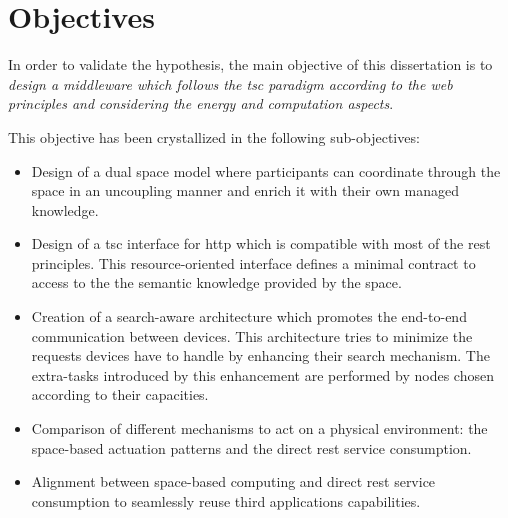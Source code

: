 \section{Objectives}

In order to validate the hypothesis, the main objective of this dissertation is to
\emph{design a middleware which follows the \ac{tsc} paradigm according to the web principles and considering the energy and computation aspects}.

This objective has been crystallized in the following sub-objectives:

\begin{itemize} %
  \item Design of a dual space model where participants can coordinate through the space in an uncoupling manner and enrich it with their own managed knowledge.
  \item Design of a \ac{tsc} interface for \ac{http} which is compatible with most of the \ac{rest} principles.
	This resource-oriented interface defines a minimal contract to access to the the semantic knowledge provided by the space. %
  \item Creation of a search-aware architecture which promotes the end-to-end communication between devices. %
	This architecture tries to minimize the requests devices have to handle by enhancing their search mechanism.
	The extra-tasks introduced by this enhancement are performed by nodes chosen according to their capacities.
  \item Comparison of different mechanisms to act on a physical environment: the space-based actuation patterns and the direct \ac{rest} service consumption.
  \item Alignment between space-based computing and direct \ac{rest} service consumption to seamlessly reuse third applications capabilities.
\end{itemize}